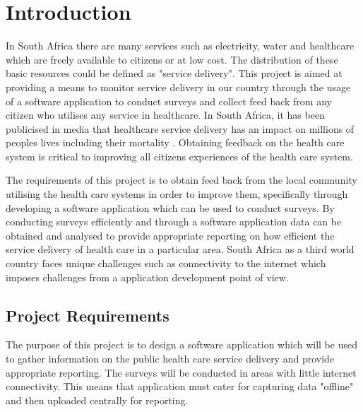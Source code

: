 \documentclass[12pt]{witseiepaper}
\begin{document}


\pagestyle{plain}


\tableofcontents

\newpage
\listoffigures %
\newpage
\listoftables %
\newpage
\renewcommand\thesection{\arabic{section}}
\renewcommand\thesubsection{\thesection.\arabic{subsection}}
 \setcounter{section}{0}
\setcounter{page}{1}
%
\section{Introduction}
In South Africa there are many services such as electricity, water and healthcare which are freely available to citizens or at low cost. The distribution of these basic resources could be defined as "service delivery". This project is aimed at providing a means to monitor service delivery in our country through the usage of a software application to conduct surveys and collect feed back from any citizen who utilises any service in healthcare. In South Africa, it has been publicised in media that healthcare service delivery has an impact on millions of peoples lives including their mortality \cite{InfantsDie}. Obtaining feedback on the health care system is critical to improving all citizens experiences of the health care system.

The requirements of this project is to obtain feed back from the local community utilising the health care systems in order to improve them, specifically through developing a software application which can be used to conduct surveys. By conducting surveys efficiently and through a software application data can be obtained and analysed to provide appropriate reporting on how efficient the service delivery of health care in a particular area. South Africa as a third world country faces unique challenges such as connectivity to the internet \cite{Internet} which imposes challenges from a application development point of view. 

\subsection{Project Requirements}
The purpose of this project is to design a software application which will be used to gather information on the public health care service delivery and provide appropriate reporting. The surveys will be conducted in areas with little internet connectivity. This means that application must cater for capturing data "offline" and then uploaded centrally for reporting.
\end{document}
